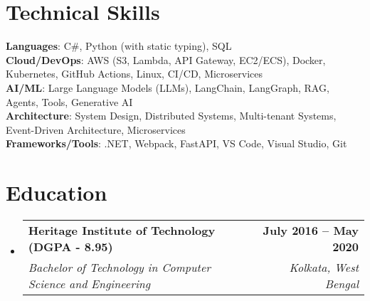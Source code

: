 \documentclass[letterpaper,11pt]{article}
\makeatletter
\newcommand{\resumeSubheading}[4]{
  \vspace{-2pt}\item
    \begin{tabular*}{1.0\textwidth}[t]{l@{\extracolsep{\fill}}r}
      \textbf{#1} & \textbf{\small #2} \\
      \textit{\small#3} & \textit{\small #4} \\
    \end{tabular*}\vspace{-7pt}
}
\newcommand{\resumeSubHeadingListStart}{\begin{itemize}[leftmargin=0.0in, label={}]}
\newcommand{\resumeSubHeadingListEnd}{\end{itemize}}
\makeatother
\begin{document}
\section{Technical Skills}
 \begin{itemize}[leftmargin=0.15in, label={}]
    \small{\item{
     \textbf{Languages}{: C\#, Python (with static typing), SQL} \\
     \textbf{Cloud/DevOps}{: AWS (S3, Lambda, API Gateway, EC2/ECS), Docker, Kubernetes, GitHub Actions, Linux, CI/CD, Microservices} \\
     \textbf{AI/ML}{: Large Language Models (LLMs), LangChain, LangGraph, RAG, Agents, Tools, Generative AI} \\
     \textbf{Architecture}{: System Design, Distributed Systems, Multi-tenant Systems, Event-Driven Architecture, Microservices} \\
     \textbf{Frameworks/Tools}{: .NET, Webpack, FastAPI, VS Code, Visual Studio, Git} \\
    }}
 \end{itemize}
 \vspace{-16pt}

 
\section{Education}
  \resumeSubHeadingListStart
    \resumeSubheading
      {Heritage Institute of Technology (DGPA - 8.95) }{July 2016 -- May 2020}
      {Bachelor of Technology in Computer Science and Engineering} {Kolkata, West Bengal} \\
   
  \resumeSubHeadingListEnd
\end{document}
